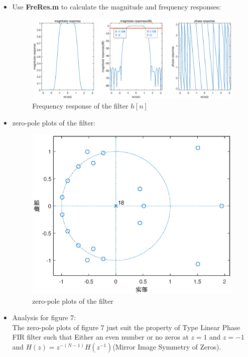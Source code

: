 \documentclass[onecolumn,oneside]{SUSTechHomework}
\begin{document}
\begin{itemize}
    \item Use \textbf{FreRes.m} to calculate the magnitude and frequency responses:
    \begin{figure}[H]
        \centering
        \includegraphics[width=170mm]{pictures/q6_3_1(a).eps}
        \caption{Frequency response of the filter $h[n]$}
    \end{figure}
    \item zero-pole plots of the filter:
    \begin{figure}[H]
        \centering
        \includegraphics[width=170mm]{pictures/q6_3_1(b).eps}
        \caption{zero-pole plots of the filter}    
    \end{figure}
    \item Analysis for figure 7:\\ 
    The zero-pole plots of figure 7 just suit the property of Type \MakeUppercase{} Linear Phase FIR filter
    such that Either an even number or no zeros at $z=1$ and $z=-1$ and $H(z)=z^{-(N-1)} H\left(z^{-1}\right)$(Mirror Image Symmetry of Zeros).

\end{itemize}
\end{document}
